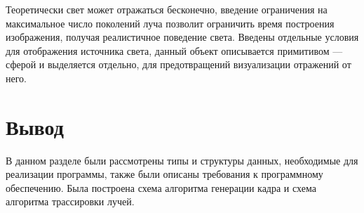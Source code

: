 \newpage
Теоретически свет может отражаться бесконечно, введение ограничения на максимальное число поколений луча позволит ограничить время построения изображения,
получая  реалистичное поведение света. Введены отдельные условия для отображения источника света, данный объект описывается примитивом --- сферой и выделяется отдельно,
для предотвращений визуализации отражений от него.












\section*{Вывод}

В данном разделе были рассмотрены типы и структуры данных, необходимые для реализации программы, также были описаны требования к программному обеспечению. Была построена схема алгоритма генерации кадра и схема алгоритма трассировки лучей.




